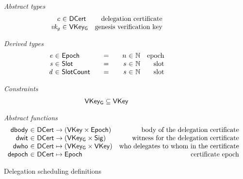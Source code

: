\begin{figure}[htb]
  \emph{Abstract types}
  \begin{equation*}
    \begin{array}{r@{~\in~}lr}
      c & \DCert & \text{delegation certificate}\\
      \var{vk_g} & \VKeyGen & \text{genesis verification key}\\
    \end{array}
  \end{equation*}

  \emph{Derived types}
  \begin{equation*}
    \begin{array}{r@{~\in~}l@{\qquad=\qquad}r@{~\in~}lr}
      \var{e} & \Epoch & n & \mathbb{N} & \text{epoch}\\
      \var{s} & \Slot & s & \mathbb{N} & \text{slot}\\
      \var{d} & \SlotCount & s & \mathbb{N} & \text{slot}
    \end{array}
  \end{equation*}

  \emph{Constraints}
  \begin{align*}
    \mathsf{VKey_G} \subseteq \mathsf{VKey}
  \end{align*}

  \emph{Abstract functions}
  \begin{equation*}
    \begin{array}{r@{~\in~}lr}
      \fun{dbody} & \DCert \to (\VKey \times \Epoch)
      & \text{body of the delegation certificate}\\
      \fun{dwit} & \DCert \to (\VKeyGen \times \Sig)
      & \text{witness for the delegation certificate}\\
      \fun{dwho} & \DCert \mapsto (\VKeyGen \times \VKey)
      & \text{who delegates to whom in the certificate}\\
      \fun{depoch} & \DCert \mapsto \Epoch
      & \text{certificate epoch}
    \end{array}
  \end{equation*}
  \caption{Delegation scheduling definitions}
  \label{fig:defs:delegation-scheduling}
\end{figure}

